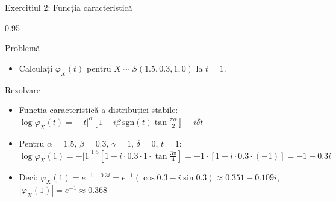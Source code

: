 \documentclass[9pt, aspectratio=169, t]{beamer}
\begin{document}
\begin{frame}{Exercițiul 2: Funcția caracteristică}
    \begin{cminipage}{0.95\textwidth}
\begin{block}{Problemă}
\begin{itemize}\setlength{\itemsep}{0pt}
    \item Calculați $\varphi_X(t)$ pentru $X \sim S(1.5, 0.3, 1, 0)$ la $t = 1$.
\end{itemize}
\end{block}

\begin{exampleblock}{Rezolvare}
\small
\begin{itemize}\setlength{\itemsep}{0pt}
    \item Funcția caracteristică a distribuției stabile:
$\log \varphi_X(t) = -|t|^\alpha \left[1 - i\beta\,\text{sgn}(t)\tan\frac{\pi\alpha}{2}\right] + i\delta t$
    \item Pentru $\alpha = 1.5$, $\beta = 0.3$, $\gamma = 1$, $\delta = 0$, $t = 1$:
$\log \varphi_X(1) = -|1|^{1.5}\left[1 - i \cdot 0.3 \cdot 1 \cdot \tan\frac{3\pi}{4}\right]
= -1 \cdot [1 - i \cdot 0.3 \cdot (-1)] = -1 - 0.3i$
    \item Deci:
$\varphi_X(1) = e^{-1 - 0.3i} = e^{-1}(\cos 0.3 - i\sin 0.3) \approx 0.351 - 0.109i$, \;
$|\varphi_X(1)| = e^{-1} \approx 0.368$
\end{itemize}
\end{exampleblock}
    \end{cminipage}
\end{frame}
\end{document}
